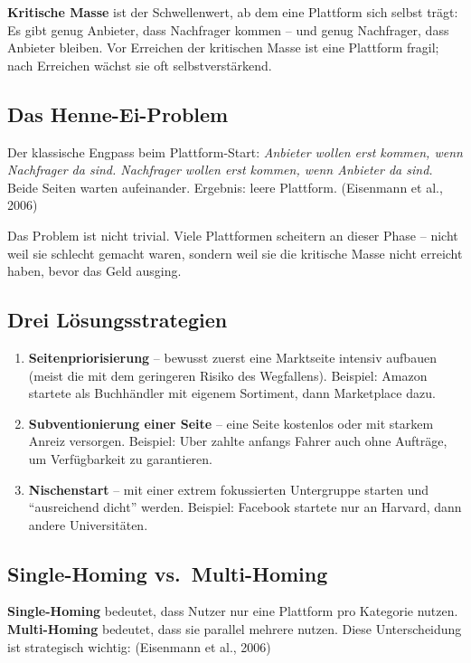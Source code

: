 \documentclass[11pt,a4paper,oneside]{article}
\newcommand{\fachbegriff}[1]{\textbf{#1}}
\newcommand{\quelle}[1]{{\footnotesize\color{lpGray}(#1)}}
\begin{document}
\fachbegriff{Kritische Masse} ist der Schwellenwert, ab dem eine Plattform sich selbst trägt: Es gibt genug Anbieter, dass Nachfrager kommen -- und genug Nachfrager, dass Anbieter bleiben. Vor Erreichen der kritischen Masse ist eine Plattform fragil; nach Erreichen wächst sie oft selbstverstärkend.

\subsection{Das Henne-Ei-Problem}

Der klassische Engpass beim Plattform-Start: \emph{Anbieter wollen erst kommen, wenn Nachfrager da sind. Nachfrager wollen erst kommen, wenn Anbieter da sind.} Beide Seiten warten aufeinander. Ergebnis: leere Plattform. \quelle{Eisenmann et al., 2006}

Das Problem ist nicht trivial. Viele Plattformen scheitern an dieser Phase -- nicht weil sie schlecht gemacht waren, sondern weil sie die kritische Masse nicht erreicht haben, bevor das Geld ausging.

\subsection{Drei Lösungsstrategien}

\begin{enumerate}
  \item \fachbegriff{Seitenpriorisierung} -- bewusst zuerst eine Marktseite intensiv aufbauen (meist die mit dem geringeren Risiko des Wegfallens). Beispiel: Amazon startete als Buchhändler mit eigenem Sortiment, dann Marketplace dazu.
  \item \fachbegriff{Subventionierung einer Seite} -- eine Seite kostenlos oder mit starkem Anreiz versorgen. Beispiel: Uber zahlte anfangs Fahrer auch ohne Aufträge, um Verfügbarkeit zu garantieren.
  \item \fachbegriff{Nischenstart} -- mit einer extrem fokussierten Untergruppe starten und ``ausreichend dicht'' werden. Beispiel: Facebook startete nur an Harvard, dann andere Universitäten.
\end{enumerate}

\subsection{Single-Homing vs.\ Multi-Homing}

\fachbegriff{Single-Homing} bedeutet, dass Nutzer nur eine Plattform pro Kategorie nutzen. \fachbegriff{Multi-Homing} bedeutet, dass sie parallel mehrere nutzen. Diese Unterscheidung ist strategisch wichtig: \quelle{Eisenmann et al., 2006}
\end{document}
